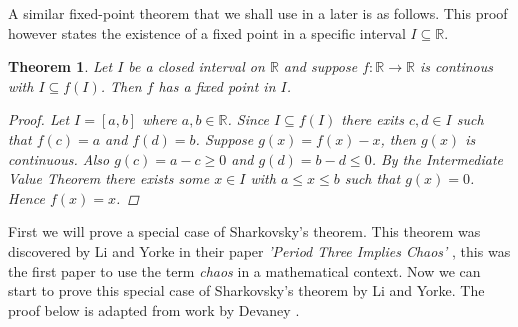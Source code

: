 \documentclass[11pt,a4paper,oneside]{memoir}
\theoremstyle{plain}
\newtheorem{thm}{Theorem}[chapter]
\theoremstyle{definition}
\begin{document}
A similar fixed-point theorem that we shall use in a later is as follows. This proof however states the existence of a fixed point in a specific interval $I \subseteq \mathbb{R}$.

\begin{thm} \label{thm:interval-fixed-points}
    Let $I$ be a closed interval on $\mathbb{R}$ and suppose $f: \mathbb{R} \to \mathbb{R}$ is continous with $I \subseteq f(I)$. Then $f$ has a fixed point in $I$.
    \begin{proof}
        Let $I = [a, b]$ where $a, b \in \mathbb{R}$. Since $I \subseteq f(I)$ there exits $c, d \in I$ such that $f(c) = a$ and $f(d) = b$. Suppose $g(x) = f(x) - x$, then $g(x)$ is continuous. Also $g(c) = a - c \geq 0$ and $g(d) = b - d \leq 0$. By the Intermediate Value Theorem there exists some $x \in I$ with $a \leq x \leq b$ such that $g(x) = 0$. Hence $f(x) = x$.
    \end{proof}
\end{thm}

First we will prove a special case of Sharkovsky's theorem. This theorem was discovered by Li and Yorke in their paper \emph{'Period Three Implies Chaos'} \cite{li-yorke}, this was the first paper to use the term \emph{chaos} in a mathematical context. Now we can start to prove this special case of Sharkovsky's theorem by Li and Yorke. The proof below is adapted from work by Devaney \cite[Chapter 1.10]{devaney}.
\end{document}
